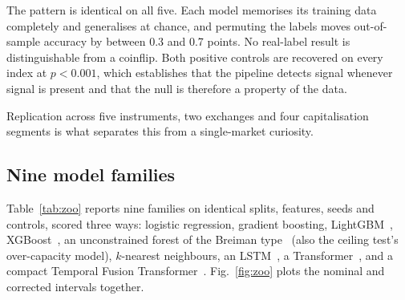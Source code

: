 \documentclass[conference]{IEEEtran}
\begin{document}
The pattern is identical on all five. Each model memorises its training data
completely and generalises at chance, and permuting the labels moves
out-of-sample accuracy by between 0.3 and 0.7 points. No real-label result is
distinguishable from a coinflip. Both positive controls are recovered on every
index at $p < 0.001$, which establishes that the pipeline detects signal
whenever signal is present and that the null is therefore a property of the
data.

Replication across five instruments, two exchanges and four capitalisation
segments is what separates this from a single-market curiosity.

\subsection{Nine model families}

Table~\ref{tab:zoo} reports nine families on identical splits, features, seeds
and controls, scored three ways: logistic regression, gradient boosting,
LightGBM~\cite{ke2017}, XGBoost~\cite{chen2016}, an unconstrained forest of the
Breiman type~\cite{breiman2001} (also the ceiling test's over-capacity model),
$k$-nearest neighbours, an LSTM~\cite{hochreiter1997}, a
Transformer~\cite{vaswani2017}, and a compact Temporal Fusion
Transformer~\cite{lim2021}. Fig.~\ref{fig:zoo} plots the nominal and corrected
intervals together.
\end{document}
